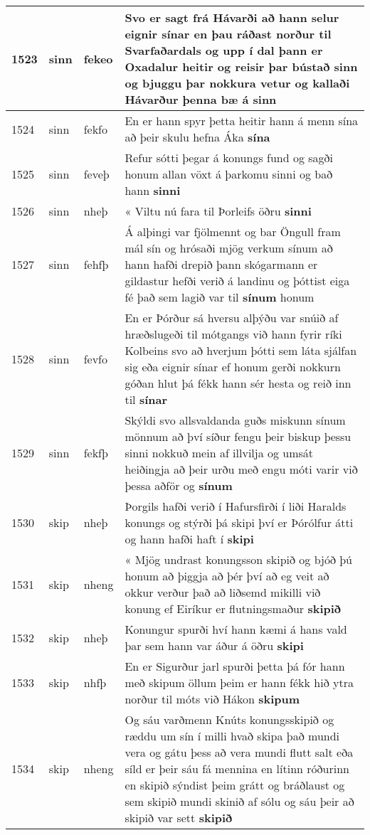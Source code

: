 \documentclass{article}
\begin{document}
\begin{longtable}{p{1cm}|p{1cm}|p{1cm}|p{13cm}}
\hline
1523&sinn&fekeo&Svo er sagt frá Hávarði að hann selur eignir sínar en þau ráðast norður til Svarfaðardals og upp í dal þann er Oxadalur heitir og reisir þar bústað sinn og bjuggu þar nokkura vetur og kallaði Hávarður þenna bæ á \textbf{sinn} \\
\hline
1524&sinn&fekfo&En er hann spyr þetta heitir hann á menn sína að þeir skulu hefna Áka \textbf{sína} \\
\hline
1525&sinn&feveþ&Refur sótti þegar á konungs fund og sagði honum allan vöxt á þarkomu sinni og bað hann \textbf{sinni} \\
\hline
1526&sinn&nheþ&« Viltu nú fara til Þorleifs öðru \textbf{sinni} \\
\hline
1527&sinn&fehfþ&Á alþingi var fjölmennt og bar Öngull fram mál sín og hrósaði mjög verkum sínum að hann hafði drepið þann skógarmann er gildastur hefði verið á landinu og þóttist eiga fé það sem lagið var til \textbf{sínum} honum\\
\hline
1528&sinn&fevfo&En er Þórður sá hversu alþýðu var snúið af hræðslugeði til mótgangs við hann fyrir ríki Kolbeins svo að hverjum þótti sem láta sjálfan sig eða eignir sínar ef honum gerði nokkurn góðan hlut þá fékk hann sér hesta og reið inn til \textbf{sínar} \\
\hline
1529&sinn&fekfþ&Skýldi svo allsvaldanda guðs miskunn sínum mönnum að því síður fengu þeir biskup þessu sinni nokkuð mein af illvilja og umsát heiðingja að þeir urðu með engu móti varir við þessa aðför og \textbf{sínum} \\
\hline
1530&skip&nheþ&Þorgils hafði verið í Hafursfirði í liði Haralds konungs og stýrði þá skipi því er Þórólfur átti og hann hafði haft í \textbf{skipi} \\
\hline
1531&skip&nheng&« Mjög undrast konungsson skipið og bjóð þú honum að þiggja að þér því að eg veit að okkur verður það að liðsemd mikilli við konung ef Eiríkur er flutningsmaður \textbf{skipið} \\
\hline
1532&skip&nheþ&Konungur spurði hví hann kæmi á hans vald þar sem hann var áður á öðru \textbf{skipi} \\
\hline
1533&skip&nhfþ&En er Sigurður jarl spurði þetta þá fór hann með skipum öllum þeim er hann fékk hið ytra norður til móts við Hákon \textbf{skipum} \\
\hline
1534&skip&nheng&Og sáu varðmenn Knúts konungsskipið og ræddu um sín í milli hvað skipa það mundi vera og gátu þess að vera mundi flutt salt eða síld er þeir sáu fá mennina en lítinn róðurinn en skipið sýndist þeim grátt og bráðlaust og sem skipið mundi skinið af sólu og sáu þeir að skipið var sett \textbf{skipið} \\

\end{longtable}
\end{document}
